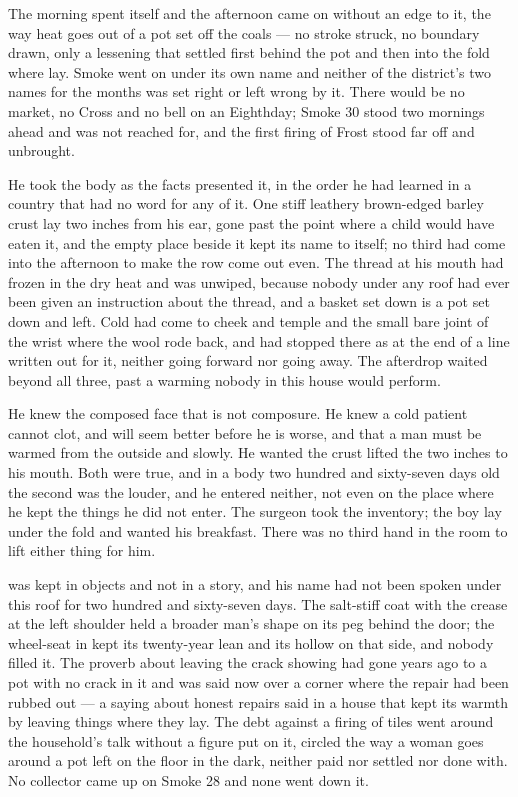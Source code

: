 The morning spent itself and the afternoon came on without an edge to it, the way heat goes out of a pot set off the coals --- no stroke struck, no boundary drawn, only a lessening that settled first behind the pot and then into the fold where  lay. Smoke went on under its own name and neither of the district's two names for the months was set right or left wrong by it. There would be no market, no Cross and no bell on an Eighthday; Smoke 30 stood two mornings ahead and was not reached for, and the first firing of Frost stood far off and unbrought.

He took the body as the facts presented it, in the order he had learned in a country that had no word for any of it. One stiff leathery brown-edged barley crust lay two inches from his ear, gone past the point where a child would have eaten it, and the empty place beside it kept its name to itself; no third had come into the afternoon to make the row come out even. The thread at his mouth had frozen in the dry heat and was unwiped, because nobody under any roof had ever been given an instruction about the thread, and a basket set down is a pot set down and left. Cold had come to cheek and temple and the small bare joint of the wrist where the wool rode back, and had stopped there as at the end of a line written out for it, neither going forward nor going away. The afterdrop waited beyond all three, past a warming nobody in this house would perform.

He knew the composed face that is not composure. He knew a cold patient cannot clot, and will seem better before he is worse, and that a man must be warmed from the outside and slowly. He wanted the crust lifted the two inches to his mouth. Both were true, and in a body two hundred and sixty-seven days old the second was the louder, and he entered neither, not even on the place where he kept the things he did not enter. The surgeon took the inventory; the boy lay under the fold and wanted his breakfast. There was no third hand in the room to lift either thing for him.

 was kept in objects and not in a story, and his name had not been spoken under this roof for two hundred and sixty-seven days. The salt-stiff coat with the crease at the left shoulder held a broader man's shape on its peg behind the door; the wheel-seat in  kept its twenty-year lean and its hollow on that side, and nobody filled it. The proverb about leaving the crack showing had gone years ago to a pot with no crack in it and was said now over a corner where the repair had been rubbed out --- a saying about honest repairs said in a house that kept its warmth by leaving things where they lay. The debt against a firing of tiles went around the household's talk without a figure put on it, circled the way a woman goes around a pot left on the floor in the dark, neither paid nor settled nor done with. No collector came up  on Smoke 28 and none went down it.

